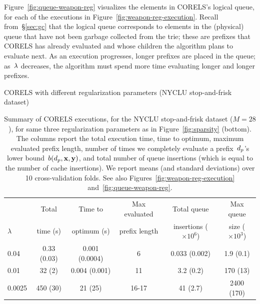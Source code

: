Figure~\ref{fig:queue-weapon-reg} visualizes the elements in CORELS's logical queue,
for each of the executions in Figure~\ref{fig:weapon-reg-execution}.
%
Recall from~\S\ref{sec:gc} that the logical queue corresponds to elements in the
(physical) queue that have not been garbage collected from the trie; these are prefixes that
CORELS has already evaluated and whose children the algorithm plans to evaluate next.
%
As an execution progresses, longer prefixes are placed in the queue;
as~${\lambda}$ decreases, the algorithm must spend more time evaluating longer and longer prefixes.

\begin{table}[t!]
\begin{centering}
CORELS with different regularization parameters (NYCLU stop-and-frisk dataset) \\
\end{centering}
\vspace{2mm}
\begin{tabular}{l | c | c | c | c | c}
& Total & Time to & Max evaluated & Total queue &  Max queue \\
$\lambda$ & time (s) & optimum (s) & prefix length & insertions ($\times 10^6$) & size ($\times 10^3$) \\
\hline
0.04 & 0.33 (0.03) & 0.001 (0.0004) & 6 & 0.033 (0.002) & 1.9 (0.1) \\
0.01 & 32 (2) & 0.004 (0.001) & 11 & 3.2 (0.2) & 170 (13) \\
0.0025 & 450 (30) & 21 (25) & 16-17 & 41 (2.7) & 2400 (170) \\
\end{tabular}
\caption{Summary of CORELS executions, for the NYCLU stop-and-frisk dataset (${M = 28}$),
for same three regularization parameters as in Figure~\ref{fig:sparsity} (bottom).
%
The columns report the total execution time,
time to optimum, maximum evaluated prefix length,
number of times we completely evaluate a prefix~$d_p$'s lower bound~$b(d_p, \mathbf{x}, \mathbf{y})$,
and total number of queue insertions (which is equal to the number of cache insertions).
%
We report means (and standard deviations) over 10 cross-validation folds.
%
See also Figures~\ref{fig:weapon-reg-execution} and~\ref{fig:queue-weapon-reg}.
}
\vspace{4mm}
\label{tab:weapon-reg}
\end{table}

